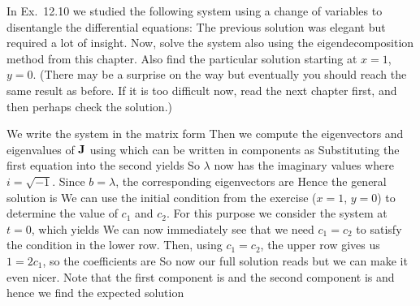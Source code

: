 In Ex.~12.10 we studied the following system using a change of variables to disentangle the differential equations:
The previous solution was elegant but required a lot of insight. Now, solve the system also using the eigendecomposition method from this chapter. Also find the particular solution starting at $x=1$, $y=0$. (There may be a surprise on the way but eventually you should reach the same result as before. If it is too difficult now, read the next chapter first, and then perhaps check the solution.) 

\solution

We write the system in the matrix form 
Then we compute the eigenvectors and eigenvalues of $\bf J$ using 
which can be written in components as 
Substituting the first equation into the second yields 
So $\lambda$ now has the imaginary values 
where $i=\sqrt{-1}$. Since $b=\lambda$, the corresponding eigenvectors are
Hence the general solution is 
We can use the initial condition from the exercise ($x=1$, $y=0$) to determine the value of $c_1$ and $c_2$. For this purpose we consider the system at $t=0$, which yields 
We can now immediately see that we need $c_1 = c_2$ to satisfy the condition in the lower row. Then, using $c_1=c_2$, the upper row gives us $1=2c_1$, so the coefficients are 
So now our full solution reads 
but we can make it even nicer. Note that the first component is 
and the second component is 
and hence we find the expected solution 





